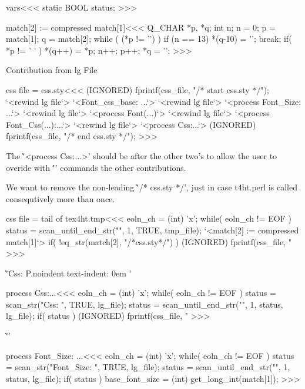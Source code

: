 {\<vars\><<<
static BOOL status;
>>>



\<match[2] := compressed match[1]\><<<
{                          Q_CHAR *p, *q;
                           int  n;
  n = 0;  p = match[1];    q = match[2];  
  while ( (*p != '\0') ){ 
    if (n == 13) { *(q-10) = '\0';  break;}
    if( *p != ' ' ){ *(q++) = *p; n++; }
    p++;
  }
  *q = '\0';
}
>>>

Contribution from lg File



\<css file = css.sty\><<<
(IGNORED) fprintf(css_file, "/* start css.sty */\n");
`<rewind lg file`>  `<Font_css_base: ...`> 
`<rewind lg file`>  `<process Font_Size: ...`> 
`<rewind lg file`>  `<process Font(...)`> 
`<rewind lg file`>  `<process Font_Css(...):...`> 
`<rewind lg file`>  `<process Css:...`>
(IGNORED) fprintf(css_file, "/* end css.sty */\n");
>>>


The \`'<process Css:...>' should be after the other two's to allow 
the user to overide with \''\Css' commands the 
other contributions.




We want to remove the non-leading \`'/* css.sty */', just
in case t4ht.perl is called consequtively more than once.

\<css file = tail of tex4ht.tmp\><<<
eoln_ch = (int) 'x';
while( eoln_ch != EOF ) {
  status = scan_until_end_str("", 1, TRUE, tmp_file);
  `<match[2] := compressed match[1]`>
  if( !eq_str(match[2], "/*css.sty*/") ){ 
     (IGNORED) fprintf(css_file, "%
  }
}
>>>



\`'Css: P.noindent { text-indent: 0em }'

\<process Css:...\><<<
eoln_ch = (int) 'x';
while( eoln_ch != EOF ) {              
   status = scan_str("Css: ", TRUE, lg_file);
   status = scan_until_end_str("", 1, status, lg_file);
   if( status ){
      (IGNORED) fprintf(css_file, "%
} } 
>>>



\`''



\<process Font_Size: ...\><<<
eoln_ch = (int) 'x';
while( eoln_ch != EOF ) {              
   status = scan_str("Font_Size: ", TRUE, lg_file);
   status = scan_until_end_str("", 1, status, lg_file);
   if( status ){
      base_font_size = (int) get_long_int(match[1]);
} } 
>>>




}
